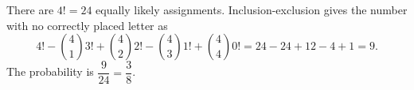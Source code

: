 There are $4!=24$ equally likely assignments. Inclusion-exclusion gives the number with no correctly placed letter as
\[
4!-\binom41 3!+\binom42 2!-\binom43 1!+\binom44 0!
=24-24+12-4+1=9.
\]
The probability is $\dfrac{9}{24}=\boxed{\dfrac{3}{8}}$.
